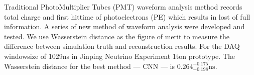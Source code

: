 Traditional PhotoMultiplier Tubes (PMT) waveform analysis method records total charge and first hittime of photoelectrons (PE) which results in lost of full information. A series of new method of waveform analysis were developed and tested. We use Wasserstein distance as the figure of merit to measure the difference between simulation truth and reconstruction results. For the DAQ windowsize of 1029ns in Jinping Neutrino Experiment 1ton prototype. The Wasserstein distance for the best method --- CNN --- is $0.264^{+0.175}_{-0.198}\mathrm{ns}$. 